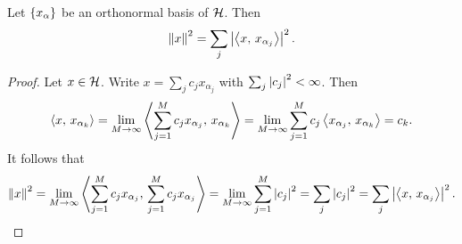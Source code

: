 \begin{proposition}
    Let $\left\{ {x_\alpha} \right\}$ be an orthonormal basis of $\mathcal{H}$. Then 
    \begin{equation*}
        \left\lVert {x} \right\rVert^2 = \sum_j\left\lvert {\left\langle {x},\, {x_{\alpha_j}} \right\rangle} \right\rvert^2.
    \end{equation*}
\end{proposition}
\begin{proof}
    Let $x\in\mathcal{H}$. Write $x = \sum_j c_jx_{\alpha_j}$ with $\sum_j \left\lvert {c_j} \right\rvert^2 < \infty$. 
    Then 
    \begin{equation*}
        \left\langle {x},\, {x_{\alpha_k}} \right\rangle = \lim_{M\to\infty}\left\langle {\sum_{j=1}^{M}c_jx_{\alpha_j}},\, {x_{\alpha_k}} \right\rangle 
        = \lim_{M\to\infty}\sum_{j=1}^{M}c_j\left\langle {x_{\alpha_j}},\, {x_{\alpha_k}} \right\rangle = c_k.
    \end{equation*}
    It follows that 
    \begin{equation*}
        \left\lVert {x} \right\rVert^2 = \lim_{M\to\infty}\left\langle {\sum_{j=1}^{M} c_jx_{\alpha_j}},\, {\sum_{j=1}^{M} c_jx_{\alpha_j}} \right\rangle
        = \lim_{M\to\infty}\sum_{j=1}^{M}\left\lvert {c_j} \right\rvert^2 = \sum_j\left\lvert {c_j} \right\rvert^2 = \sum_j\left\lvert {\left\langle {x},\, {x_{\alpha_j}} \right\rangle} \right\rvert^2.
    \end{equation*}
\end{proof}